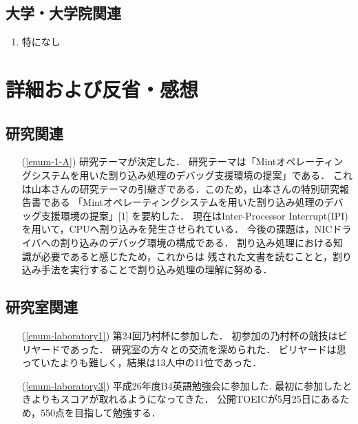\documentclass[fleqn, 14pt]{extarticle}
\begin{document}
\subsection{大学・大学院関連}
\label{sec-2-3}

\begin{enumerate}
\item 特になし
\hfill
\end{enumerate}





\section{詳細および反省・感想}
\label{sec-3}
\subsection{研究関連}
\label{sec-3-1}

\begin{itemize}
\item[(\ref{enum-1-A})]
研究テーマが決定した．
研究テーマは「Mintオペレーティングシステムを用いた割り込み処理のデバッグ支援環境の提案」である．
これは山本さんの研究テーマの引継ぎである．このため，山本さんの特別研究報告書である
「Mintオペレーティングシステムを用いた割り込み処理のデバッグ支援環境の提案」[1]
を要約した．
現在はInter-Processor Interrupt(IPI)を用いて，CPUへ割り込みを発生させられている．
今後の課題は，NICドライバへの割り込みのデバッグ環境の構成である．
割り込み処理における知識が必要であると感じたため，これからは
残された文書を読むことと，割り込み手法を実行することで割り込み処理の理解に努める．

\end{itemize}

\subsection{研究室関連}
\label{sec-3-2}

\begin{itemize}
\item[(\ref{enum-laboratory1})]
第24回乃村杯に参加した．
初参加の乃村杯の競技はビリヤードであった．
研究室の方々との交流を深められた．
ビリヤードは思っていたよりも難しく，結果は13人中の11位であった．
\item[(\ref{enum-laboratory3})]
平成26年度B4英語勉強会に参加した.
最初に参加したときよりもスコアが取れるようになってきた．
公開TOEICが5月25日にあるため，550点を目指して勉強する．
\end{itemize}
\end{document}

